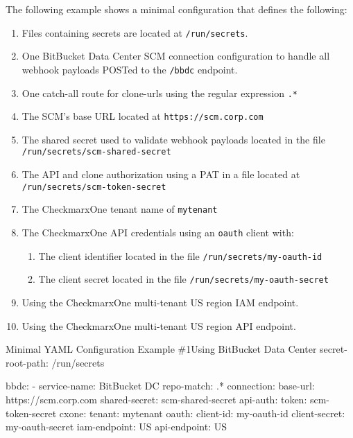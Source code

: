 The following example shows a minimal \cxoneflow configuration that defines the following:

\begin{enumerate}
    \item Files containing secrets are located at \texttt{/run/secrets}.
    \item One BitBucket Data Center SCM connection configuration to handle all webhook payloads
    POSTed to the \texttt{/bbdc} endpoint.
    \item One catch-all route for clone-urls using the regular expression \texttt{.*}
    \item The SCM's base URL located at \texttt{https://scm.corp.com}
    \item The shared secret used to validate webhook payloads located in the file \texttt{/run/secrets/scm-shared-secret}
    \item The API and clone authorization using a PAT in a file located at \texttt{/run/secrets/scm-token-secret}
    \item The CheckmarxOne tenant name of \texttt{mytenant}
    \item The CheckmarxOne API credentials using an \texttt{oauth} client with:
    \begin{enumerate}
        \item The client identifier located in the file \texttt{/run/secrets/my-oauth-id}
        \item The client secret located in the file \texttt{/run/secrets/my-oauth-secret}
    \end{enumerate}
    \item Using the CheckmarxOne multi-tenant US region IAM endpoint.
    \item Using the CheckmarxOne multi-tenant US region API endpoint.
\end{enumerate}

\begin{code}{Minimal YAML Configuration Example \#1}{Using BitBucket Data Center}{}
secret-root-path: /run/secrets

bbdc:
    - service-name: BitBucket DC
      repo-match: .*
      connection:
        base-url: https://scm.corp.com
        shared-secret: scm-shared-secret
        api-auth:
            token: scm-token-secret
      cxone:
        tenant: mytenant
        oauth:
            client-id: my-oauth-id
            client-secret: my-oauth-secret
        iam-endpoint: US
        api-endpoint: US
\end{code}

